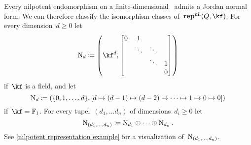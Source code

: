 \documentclass[a4paper,11pt]{scrartcl}
\begin{document}
Every nilpotent endomorphism on a finite-dimensional~\vectorspace{$\kf$} admits a Jordan normal form.
We can therefore classify the isomorphism classes of~$\repnil(Q, \kf)$:
For every dimension~$d \geq 0$ let
\[
  \Nil_d
  \defined
  \left(
    \kf^d,
    \begin{bmatrix}
      0 & 1       &         &   \\
        & \ddots  & \ddots  &   \\
        &         & \ddots  & 1 \\
        &         &         & 0
    \end{bmatrix}
  \right)
\]
if~$\kf$ is a field, and let
\[
  \mathrm{N}_d
  \coloneqq
  (
    \{ 0, 1, \dotsc, d \},
    [d \mapsto (d-1) \mapsto (d-2) \mapsto \dotsb \mapsto 1 \mapsto 0 \mapsto 0]
  )
\]
if~$\kf = \Finite_1$.
For every tupel~$(d_1, \dotsc d_n)$ of dimensions~$d_i \geq 0$ let
\[
  \mathrm{N}_{(d_1, \dotsc, d_n)}
  \coloneqq
  \mathrm{N}_{d_1} \oplus \dotsb \oplus \mathrm{N}_{d_n} \,.
\]
See \cref{nilpotent representation example} for a visualization of~$\mathrm{N}_{(d_1, \dotsc, d_n)}$.
\end{document}
